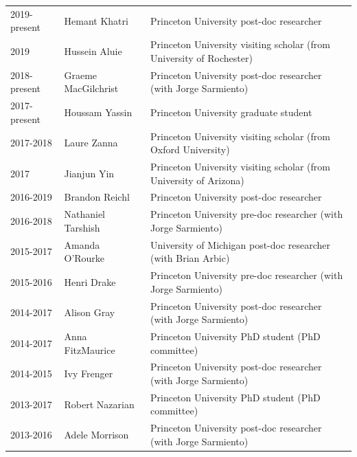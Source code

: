 \documentclass{article}
\begin{document}
\begin{tabular}{lll}

2019-present & Hemant Khatri & Princeton University post-doc researcher \\ 

2019     & Hussein Aluie & Princeton University visiting scholar (from University of Rochester)  \\ 

2018-present & Graeme MacGilchrist & Princeton University post-doc researcher (with Jorge Sarmiento) \\ 

2017-present & Houssam Yassin & Princeton University graduate student \\ 

2017-2018 & Laure Zanna  & Princeton University visiting scholar (from Oxford University)  \\

2017 & Jianjun Yin       & Princeton University visiting scholar (from University of Arizona)  \\

2016-2019 & Brandon Reichl       & Princeton University post-doc researcher  \\

2016-2018 & Nathaniel Tarshish & Princeton University pre-doc researcher (with Jorge Sarmiento) \\

2015-2017 & Amanda O'Rourke  & University of Michigan post-doc researcher (with Brian Arbic) \\

2015-2016    & Henri Drake             & Princeton University pre-doc researcher (with Jorge Sarmiento) \\

2014-2017 & Alison Gray            & Princeton University post-doc researcher (with Jorge Sarmiento) \\

2014-2017 & Anna FitzMaurice   & Princeton University PhD student (PhD committee) \\ 

2014-2015     & Ivy Frenger            & Princeton University post-doc researcher (with Jorge Sarmiento) \\

2013-2017 & Robert Nazarian    & Princeton University PhD student (PhD committee) \\ 

2013-2016     & Adele Morrison     & Princeton University post-doc researcher (with Jorge Sarmiento) \\


\end{tabular}
\end{document}
